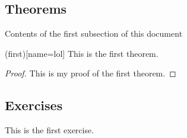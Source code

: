 \subsection{Theorems}
Contents of the first subsection of this document
\begin{theorem}(first)[name=lol]\label{thm:1.1}
    This is the first theorem.
\end{theorem}
\begin{proof}
    This is my proof of the first theorem.
\end{proof}
%
\subsection{Exercises}
\begin{exercise}\label{ex:1.1}
    This is the first exercise.
\end{exercise}
% 
% 